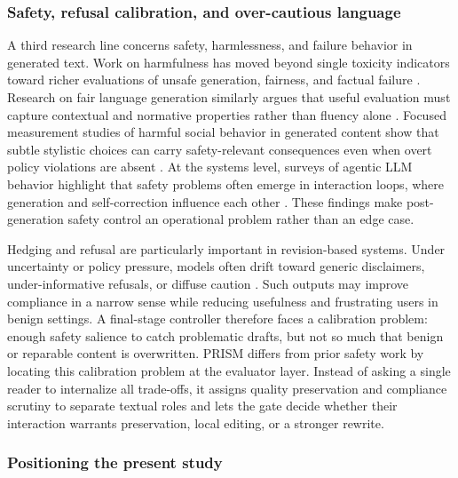 \documentclass{article}
\begin{document}
\subsubsection{Safety, refusal calibration, and over-cautious language}

\label{sec:safety_refusal_calibration_and_over_caut}

A third research line concerns safety, harmlessness, and failure behavior in generated text. Work on harmfulness has moved beyond single toxicity indicators toward richer evaluations of unsafe generation, fairness, and factual failure \cite{cui2023harmlessness}. Research on fair language generation similarly argues that useful evaluation must capture contextual and normative properties rather than fluency alone \cite{yeo2020defining}. Focused measurement studies of harmful social behavior in generated content show that subtle stylistic choices can carry safety-relevant consequences even when overt policy violations are absent \cite{snoswell2023measuring}. At the systems level, surveys of agentic LLM behavior highlight that safety problems often emerge in interaction loops, where generation and self-correction influence each other \cite{wang2024survey}. These findings make post-generation safety control an operational problem rather than an edge case.

Hedging and refusal are particularly important in revision-based systems. Under uncertainty or policy pressure, models often drift toward generic disclaimers, under-informative refusals, or diffuse caution \cite{ivgi2024loops}. Such outputs may improve compliance in a narrow sense while reducing usefulness and frustrating users in benign settings. A final-stage controller therefore faces a calibration problem: enough safety salience to catch problematic drafts, but not so much that benign or reparable content is overwritten. PRISM differs from prior safety work by locating this calibration problem at the evaluator layer. Instead of asking a single reader to internalize all trade-offs, it assigns quality preservation and compliance scrutiny to separate textual roles and lets the gate decide whether their interaction warrants preservation, local editing, or a stronger rewrite.

\subsubsection{Positioning the present study}

\label{sec:positioning_the_present_study}
\end{document}
